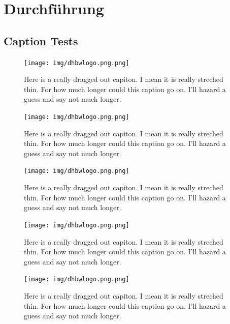 \chapter{Durchführung}
\section{Caption Tests}
\begin{figure}[htbp!]
    \centering
    \texttt{[image: img/dhbwlogo.png.png]}
    \caption{Here is a really dragged out capiton. I mean it is really streched thin. For how much longer could this caption go on. I'll hazard a guess and say not much longer.}
    \label{fig1}
\end{figure}

\captionsetup[figure]{format=hang, justification=raggedright, labelsep=colon, labelfont=normal}

\begin{figure}[htbp!]
    \centering
    \texttt{[image: img/dhbwlogo.png.png]}
    \caption{Here is a really dragged out capiton. I mean it is really streched thin. For how much longer could this caption go on. I'll hazard a guess and say not much longer.}
    \label{fig2}
\end{figure}

\captionsetup[figure]{justification=justified}

\begin{figure}[htbp!]
    \centering
    \texttt{[image: img/dhbwlogo.png.png]}
    \caption{Here is a really dragged out capiton. I mean it is really streched thin. For how much longer could this caption go on. I'll hazard a guess and say not much longer.}
    \label{fig3}
\end{figure}

\captionsetup[figure]{justification=centering}

\begin{figure}[htbp!]
    \centering
    \texttt{[image: img/dhbwlogo.png.png]}
    \caption{Here is a really dragged out capiton. I mean it is really streched thin. For how much longer could this caption go on. I'll hazard a guess and say not much longer.}
    \label{fig4}
\end{figure}

\captionsetup[figure]{justification=centerlast, format=plain}

\begin{figure}[htbp!]
    \centering
    \texttt{[image: img/dhbwlogo.png.png]}
    \caption{Here is a really dragged out capiton. I mean it is really streched thin. For how much longer could this caption go on. I'll hazard a guess and say not much longer.}
    \label{fig5}
\end{figure}

